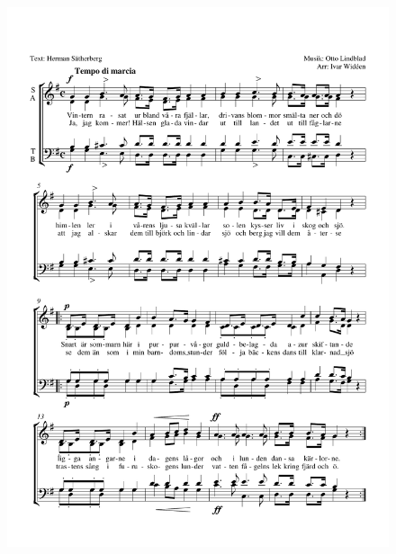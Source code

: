 \documentclass[a6paper,11pt]{article}
\begin{document}
\setlength{\oddsidemargin}{-0.67in}
\begin{center}
\end{center}
\vspace{-40pt}
\begin{figure}[!h]
\centering
\includegraphics[width=\textwidth]{langtan-till-landet}
\end{figure}
\end{document}
